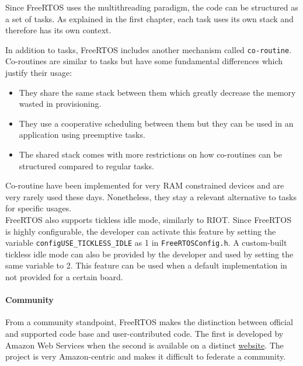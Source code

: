 Since FreeRTOS uses the multithreading paradigm, the code can be structured as a set of tasks.
As explained in the first chapter, each task uses its own stack and therefore has its own context.

In addition to tasks, FreeRTOS includes another mechanism called \texttt{co-routine}\cite{freertos-tasks-coroutines}\cite{freertos-tasks-coroutines2}.
Co-routines are similar to tasks but have some fundamental differences which justify their usage:
\begin{itemize}
    \item They share the same stack between them which greatly decrease the memory wasted in provisioning.
    \item They use a cooperative scheduling between them but they can be used in an application using preemptive tasks.
    \item The shared stack comes with more restrictions on how co-routines can be structured compared to regular tasks.
\end{itemize}
Co-routine have been implemented for very RAM constrained devices and are very rarely used these days.
Nonetheless, they stay a relevant alternative to tasks for specific usages.\\
FreeRTOS also supports tickless idle mode, similarly to RIOT.
Since FreeRTOS is highly configurable, the developer can activate this feature 
    by setting the variable \texttt{configUSE\_TICKLESS\_IDLE} as 1 in \texttt{FreeRTOSConfig.h}.
A custom-built tickless idle mode can also be provided by the developer and used by setting the same variable to 2.
This feature can be used when a default implementation in not provided for a certain board.

\paragraph{Community} From a community standpoint, FreeRTOS makes the distinction between official and supported code base and user-contributed code.
The first is developed by Amazon Web Services when the second is available on a distinct \href{https://interactive.freertos.org/hc/en-us}{website}.%
The project is very Amazon-centric and makes it difficult to federate a community.